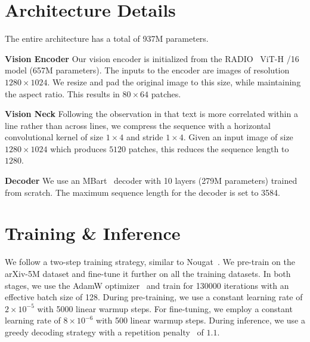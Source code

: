 \section{Architecture Details}

The entire architecture has a total of 937M parameters. 

\textbf{Vision Encoder}  Our vision encoder is initialized from the RADIO~\cite{radio} ViT-H /16 model (657M parameters). The inputs to the encoder are images of resolution $1280\times 1024$. We resize and pad the original image to this size, while maintaining the aspect ratio. This results in $80\times 64$ patches. 

\textbf{Vision Neck} Following the observation in \cite{hu2024mplugdocowl15unifiedstructure} that text is more correlated within a line rather than across lines, we compress the sequence with a horizontal convolutional kernel of size $1\times 4$ and stride $1\times 4$. Given an input image of size $1280\times 1024$ which produces $5120$ patches, this reduces the sequence length to $1280$. %

\textbf{Decoder} We use an MBart~\cite{mbart} decoder with 10 layers (279M parameters) trained from scratch. The maximum sequence length for the decoder is set to 3584. 

\section{Training \& Inference}
We follow a two-step training strategy, similar to Nougat~\cite{Nougat}. We pre-train \eclair on the arXiv-5M dataset and fine-tune it further on all the training datasets. In both stages, we use the AdamW optimizer~\cite{loshchilov2017decoupled} and train for 130000 iterations with an effective batch size of 128. During pre-training, we use a constant learning rate of $2\times 10^{-5}$ with 5000 linear warmup steps. For fine-tuning, we employ a constant learning rate of $8\times 10^{-6}$ with 500 linear warmup steps. During inference, we use a greedy decoding strategy with a repetition penalty~\cite{keskar2019ctrl} of $1.1$. %

